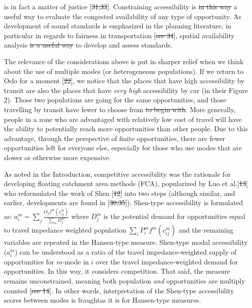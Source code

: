 \documentclass[10pt,letterpaper]{article}
\providecommand{\DIFaddtex}[1]{{\protect\color{blue}\uwave{#1}}} %
\providecommand{\DIFdeltex}[1]{{\protect\color{red}\sout{#1}}}                      %
\providecommand{\DIFaddbegin}{} %
\providecommand{\DIFaddend}{} %
\providecommand{\DIFdelbegin}{} %
\providecommand{\DIFdelend}{} %
\providecommand{\DIFadd}[1]{\texorpdfstring{\DIFaddtex{#1}}{#1}} %
\providecommand{\DIFdel}[1]{\texorpdfstring{\DIFdeltex{#1}}{}} %
\newcommand{\DIFscaledelfig}{0.5}
\newlength{\DIFdelgraphicswidth} %
\newlength{\DIFdelgraphicsheight} %
\newcommand{\DIFaddincludegraphics}[2][]{{\color{blue}\fbox{\DIFOincludegraphics[#1]{#2}}}} %
\newcommand{\DIFdelincludegraphics}[2][]{%
\sbox{\DIFdelgraphicsbox}{\DIFOincludegraphics[#1]{#2}}%
\settoboxwidth{\DIFdelgraphicswidth}{\DIFdelgraphicsbox} %
\settoboxtotalheight{\DIFdelgraphicsheight}{\DIFdelgraphicsbox} %
\scalebox{\DIFscaledelfig}{%
\parbox[b]{\DIFdelgraphicswidth}{\usebox{\DIFdelgraphicsbox}\\[-\baselineskip] \rule{\DIFdelgraphicswidth}{0em}}\llap{\resizebox{\DIFdelgraphicswidth}{\DIFdelgraphicsheight}{%
\setlength{\unitlength}{\DIFdelgraphicswidth}%
\begin{picture}(1,1)%
\thicklines\linethickness{2pt} %
{\color[rgb]{1,0,0}\put(0,0){\framebox(1,1){}}}%
{\color[rgb]{1,0,0}\put(0,0){\line( 1,1){1}}}%
{\color[rgb]{1,0,0}\put(0,1){\line(1,-1){1}}}%
\end{picture}%
}\hspace*{3pt}}} %
} %
\DeclareRobustCommand{\DIFaddbegin}{\DIFOaddbegin \let\includegraphics\DIFaddincludegraphics} %
\DeclareRobustCommand{\DIFaddend}{\DIFOaddend \let\includegraphics\DIFOincludegraphics} %
\DeclareRobustCommand{\DIFdelbegin}{\DIFOdelbegin \let\includegraphics\DIFdelincludegraphics} %
\DeclareRobustCommand{\DIFdelend}{\DIFOaddend \let\includegraphics\DIFOincludegraphics} %
\begin{document}
is in fact a matter of justice {[}\DIFdelbegin \DIFdel{31,33}\DIFdelend \DIFaddbegin \DIFadd{43,46}\DIFaddend {]}. Constraining accessibility
is \DIFdelbegin \DIFdel{in this way }\DIFdelend a useful way to evaluate the congested availability of any type of
opportunity. As development of sound standards is emphasized in the
planning literature, in particular in regards to fairness in
transportation {[}\DIFdelbegin \DIFdel{see 34}\DIFdelend \DIFaddbegin \DIFadd{47}\DIFaddend {]}, spatial availability analysis \DIFdelbegin \DIFdel{is a useful way }\DIFdelend \DIFaddbegin \DIFadd{can be used }\DIFaddend to
develop and assess standards.

The relevance of the considerations above is put in sharper relief when
we think about the use of multiple modes (or heterogeneous populations).
If we return to Oslo for a moment {[}\DIFdelbegin \DIFdel{22}\DIFdelend \DIFaddbegin \DIFadd{35}\DIFaddend {]}, we notice that the places
that have high accessibility by transit are also the places that have
\emph{very high} accessibility by car (in their Figure 2). Those two
populations are going for the same opportunities, and those travelling
by transit have fewer to choose from \DIFdelbegin \DIFdel{to begin with}\DIFdelend \DIFaddbegin \DIFadd{the start}\DIFaddend . More generally, people
in a zone who are advantaged with relatively low cost of travel will
have the ability to potentially reach more opportunities than other
people. Due to this advantage, through the perspective of finite
opportunities, there are fewer opportunities left for everyone else,
especially for those who use modes that are slower or otherwise more
expensive.

As noted in the Introduction, competitive accessibility was the
rationale for developing floating catchment area methods (FCA),
popularized by Luo et al.\DIFaddbegin \DIFadd{~(2003) }\DIFaddend {[}\DIFdelbegin \DIFdel{13}\DIFdelend \DIFaddbegin \DIFadd{28}\DIFaddend {]} who reformulated the work of
Shen \DIFaddbegin \DIFadd{(1998) }\DIFaddend {[}\DIFdelbegin \DIFdel{12}\DIFdelend \DIFaddbegin \DIFadd{24}\DIFaddend {]} into two steps (although similar, and earlier,
developments are found in {[}\DIFdelbegin \DIFdel{30,35}\DIFdelend \DIFaddbegin \DIFadd{21,23}\DIFaddend {]}). Shen-type accessibility is
formulated as: \(a_i^m = \sum_j \frac{O_jf^m(c_{ij}^m)}{\sum_m D_j^m}\)
where \(D_j^m\) is the potential demand for opportunities equal to
travel impedance weighted population \(\sum_i P_i^m f^m(c_{ij}^m)\) and
the remaining variables are repeated in the Hansen-type measure.
Shen-type modal accessibility (\(a_i^m\)) can be understood as a ratio
of the travel impedance-weighted supply of opportunities for \(m\)-mode
in \(i\) over the travel impedance-weighted demand for opportunities. In
this way, it considers competition. That said, the measure remains
unconstrained, meaning both population \emph{and} opportunities are
multiply counted {[}\DIFdelbegin \DIFdel{see 14}\DIFdelend \DIFaddbegin \DIFadd{12}\DIFaddend {]}. In other words, interpretation of the
Shen-type accessibility scores between modes is fraught\DIFaddbegin \DIFadd{, }\DIFaddend as it is for
Hansen-type measures.
\end{document}
